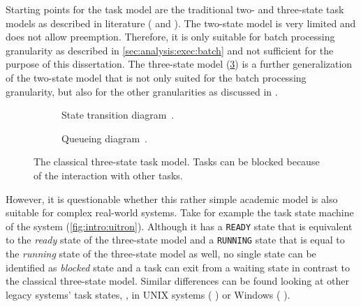 Starting points for the task model are the traditional two- and three-state task models as described in literature (\cf{}{} \textcite[Ch.~3]{Stallings-2011-OperatingSystems} and \textcite[Ch.~2]{Tanenbaum-2007-ModernOS}). The two-state model is very limited and does not allow preemption. Therefore, it is only suitable for batch processing granularity as described in \cref{sec:analysis:exec:batch} and not sufficient for the purpose of this dissertation. The three-state model (\cref{fig:intro:three-states}) is a further generalization of the two-state model that is not only suited for the batch processing granularity, but also for the other granularities as discussed in .

\begin{figure}[t!]\centering
	\begin{subfigure}{\linewidth}\centering
		\caption[State transition diagram.]{State transition diagram~\cite[p. 88]{Tanenbaum-2007-ModernOS}.}%
		\label{fig:intro:three-states:state}
		\vspace{0.75cm}
	\end{subfigure}
	\begin{subfigure}{\linewidth}\centering
		\caption[Queueing diagram.]{Queueing diagram~\cite[p. 140]{Stallings-2011-OperatingSystems}.}%
		\label{fig:intro:three-states:queue}
	\end{subfigure}
	\caption[The classical three-state task model.]{The classical three-state task model. Tasks can be blocked because of the interaction with other tasks.}%
	\label{fig:intro:three-states}
\end{figure}

However, it is questionable whether this rather simple academic model is also suitable for complex real-world systems. Take for example the task state machine of the \uitron{} system (\cref{fig:intro:uitron}). Although it has a \texttt{READY} state that is equivalent to the \emph{ready} state of the three-state model and a \texttt{RUNNING} state that is equal to the \emph{running} state of the three-state model as well, no single state can be identified as \emph{blocked} state and a task can exit from a waiting state in contrast to the classical three-state model. Similar differences can be found looking at other legacy systems' task states, \eg{}, in UNIX systems (\cf{} \textcite[148]{Bach-1986-Unix}) or Windows (\cf{} \textcite[200]{Stallings-2011-OperatingSystems}).

